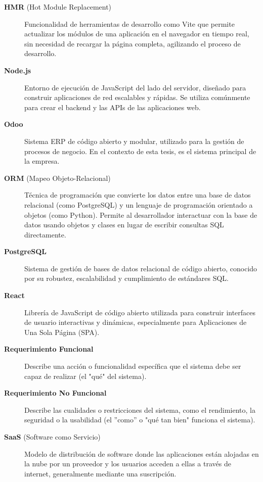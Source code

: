 \documentclass[12pt,letterpaper,spanish]{report}
\begin{document}
\begin{description}
  \item[\textbf{HMR} (Hot Module Replacement)] Funcionalidad de herramientas de desarrollo como Vite que permite actualizar los módulos de una aplicación en el navegador en tiempo real, sin necesidad de recargar la página completa, agilizando el proceso de desarrollo.

    
  \item[\textbf{Node.js}] Entorno de ejecución de JavaScript del lado del servidor, diseñado para construir aplicaciones de red escalables y rápidas. Se utiliza comúnmente para crear el backend y las APIs de las aplicaciones web.

  \item[\textbf{Odoo}] Sistema ERP de código abierto y modular, utilizado para la gestión de procesos de negocio. En el contexto de esta tesis, es el sistema principal de la empresa.
  
  \item[\textbf{ORM} (Mapeo Objeto-Relacional)] Técnica de programación que convierte los datos entre una base de datos relacional (como PostgreSQL) y un lenguaje de programación orientado a objetos (como Python). Permite al desarrollador interactuar con la base de datos usando objetos y clases en lugar de escribir consultas SQL directamente.

      

  \item[\textbf{PostgreSQL}] Sistema de gestión de bases de datos relacional de código abierto, conocido por su robustez, escalabilidad y cumplimiento de estándares SQL.

  \item[\textbf{React}] Librería de JavaScript de código abierto utilizada para construir interfaces de usuario interactivas y dinámicas, especialmente para Aplicaciones de Una Sola Página (SPA).
  \item[\textbf{Requerimiento Funcional}] Describe una acción o funcionalidad específica que el sistema debe ser capaz de realizar (el "qué" del sistema).

  \item[\textbf{Requerimiento No Funcional}] Describe las cualidades o restricciones del sistema, como el rendimiento, la seguridad o la usabilidad (el ''como'' o "qué tan bien" funciona el sistema).

  \item[\textbf{SaaS} (Software como Servicio)] Modelo de distribución de software donde las aplicaciones están alojadas en la nube por un proveedor y los usuarios acceden a ellas a través de internet, generalmente mediante una suscripción.


\end{description}
\end{document}
